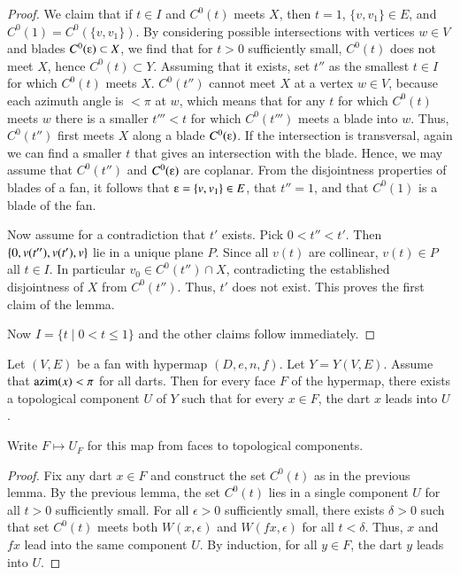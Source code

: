 {\begin{proof}
We claim that if $t\in I$ and $C^0(t)$ meets $X$, then $t=1$, $\{v,v_1\}\in E$, and $C^0(1)= C^0(\{v,v_1\})$.  By considering possible intersections with vertices $w\in V$ and blades
$C^0(\e)\subset X$, we find that for $t>0$ sufficiently small,
$C^0(t)$ does not meet $X$, hence $C^0(t)\subset Y$.  Assuming 
that it exists, set $t''$
as the smallest $t\in I$ for which $C^0(t)$ meets $X$.   
$C^0(t'')$ cannot meet $X$ at a vertex $w\in V$, because each azimuth angle
is $<\pi$ at $w$, which means that for any $t$ for which  $C^0(t)$ meets $w$ 
there is a smaller $t'''<t$ for which $C^0(t''')$ meets a blade into $w$.
Thus, $C^0(t'')$ first meets $X$ along a blade $C^0(\e)$. If
the intersection is transversal, again we can find a smaller $t$ that
gives an intersection with the blade.  Hence, we may assume that
$C^0(t'')$ and $C^0(\e)$ are coplanar.  From the disjointness
properties of blades of a fan, it follows that $\e = \{v,v_1\}\in E$,
that $t''=1$, and that $C^0(1)$ is a blade of the fan.

Now assume for a contradiction that $t'$ exists.  Pick $0<t''<t'$.  Then
$\{0,v(t''),v(t'),v\}$ lie in a unique plane $P$.  Since all $v(t)$
are collinear,  $v(t)\in P$ all $t\in I$.  In particular $v_0\in C^0(t'')\cap X$,
contradicting the established disjointness of $X$ from $C^0(t'')$.  Thus, $t'$ does not exist.  This proves the first
claim of the lemma.  

Now $I= \{t\mid 0 < t \le 1\}$ and the other claims follow immediately.
\end{proof}

\begin{lemma} 
Let $(V,E)$ be a fan with hypermap $(D,e,n,f)$. Let $Y=Y(V,E)$. Assume that ${\operatorname{azim}}(x)<\pi$ for all darts. Then for every face $F$ of the hypermap, there exists a topological component $U$ of $Y$ such that for every $x\in F$, the dart $x$ leads into $U$. 
\end{lemma}

Write $F\mapsto U_F$ for this map from faces to topological components.

\begin{proof}  Fix any dart $x\in F$ and construct the set $C^0(t)$ as
in the previous lemma.  By the previous lemma, the set $C^0(t)$ lies in a single
component $U$ for all $t>0$ sufficiently small.  For all $\epsilon>0$
sufficiently small, there exists $\delta>0$ such that set $C^0(t)$ meets
both $W(x,\epsilon)$ and $W(f x,\epsilon)$ for all $t<\delta$.  Thus,
$x$ and $f x$ lead into the same component $U$.  By induction, for all
$y\in F$, the dart $y$ leads into $U$.
\end{proof}

}

